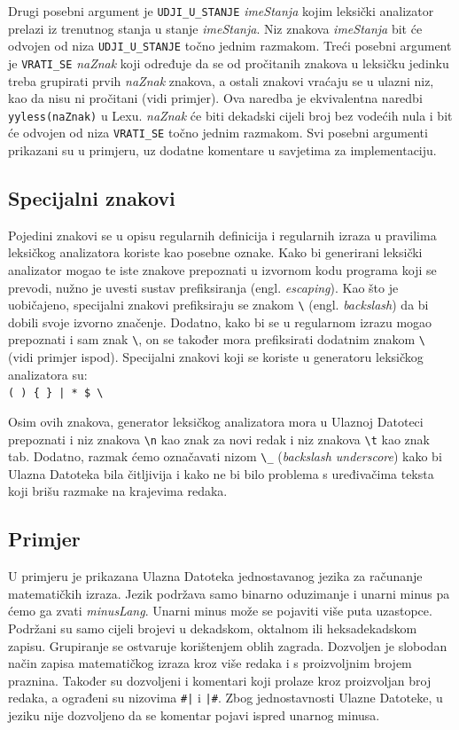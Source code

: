 \documentclass[times, 12pt, utf8]{book}
\begin{document}
Drugi posebni argument je \verb|UDJI_U_STANJE| \emph{imeStanja} kojim leksički analizator prelazi iz trenutnog stanja u stanje \emph{imeStanja}.
Niz znakova \emph{imeStanja} bit će odvojen od niza \verb|UDJI_U_STANJE| točno jednim razmakom.
Treći posebni argument je \verb|VRATI_SE| \emph{naZnak} koji određuje da se od pročitanih znakova u leksičku jedinku treba grupirati prvih \emph{naZnak} znakova, a ostali znakovi vraćaju se u ulazni niz, kao da nisu ni pročitani (vidi primjer).
Ova naredba je ekvivalentna naredbi \verb|yyless(naZnak)| u Lexu.
\emph{naZnak} će biti dekadski cijeli broj bez vodećih nula i bit će odvojen od niza \verb|VRATI_SE| točno jednim razmakom.
Svi posebni argumenti prikazani su u primjeru, uz dodatne komentare u savjetima za implementaciju.

\subsection{Specijalni znakovi}\label{sec:specijalni_znakovi}
Pojedini znakovi se u opisu regularnih definicija i regularnih izraza u pravilima leksičkog analizatora koriste kao posebne oznake.
Kako bi generirani leksički analizator mogao te iste znakove prepoznati u izvornom kodu programa koji se prevodi, nužno je uvesti sustav prefiksiranja (engl. \emph{escaping}).
Kao što je uobičajeno, specijalni znakovi prefiksiraju se znakom \verb|\| (engl. \emph{backslash}) da bi dobili svoje izvorno značenje.
Dodatno, kako bi se u regularnom izrazu mogao prepoznati i sam znak \verb|\|, on se također mora prefiksirati dodatnim znakom \verb|\| (vidi primjer ispod).
Specijalni znakovi koji se koriste u generatoru leksičkog analizatora su:\\
\verb=( ) { } | * $ \=

Osim ovih znakova, generator leksičkog analizatora mora u Ulaznoj Datoteci prepoznati i niz znakova \verb|\n| kao znak za novi redak i niz znakova \verb|\t| kao znak tab.
Dodatno, razmak ćemo označavati nizom \verb|\_| (\emph{backslash underscore}) kako bi Ulazna Datoteka bila čitljivija i kako ne bi bilo problema s uređivačima teksta koji brišu razmake na krajevima redaka.

\subsection{Primjer}\label{sec:generator_primjer}
U primjeru je prikazana Ulazna Datoteka jednostavanog jezika za računanje matematičkih izraza.
Jezik podržava samo binarno oduzimanje i unarni minus pa ćemo ga zvati \emph{minusLang}.
Unarni minus može se pojaviti više puta uzastopce.
Podržani su samo cijeli brojevi u dekadskom, oktalnom ili heksadekadskom zapisu.
Grupiranje se ostvaruje korištenjem oblih zagrada.
Dozvoljen je slobodan način zapisa matematičkog izraza kroz više redaka i s proizvoljnim brojem praznina.
Također su dozvoljeni i komentari koji prolaze kroz proizvoljan broj redaka, a ograđeni su nizovima \verb=#|= i \verb=|#=.
Zbog jednostavnosti Ulazne Datoteke, u jeziku nije dozvoljeno da se komentar pojavi ispred unarnog minusa.
\end{document}

